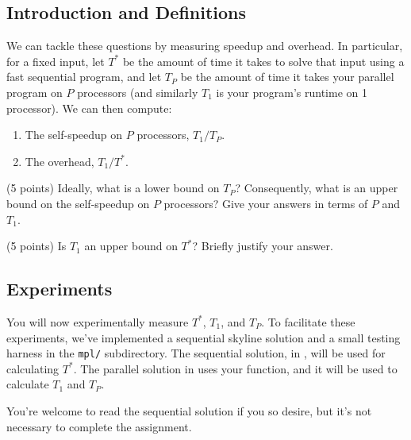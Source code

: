 \subsection{Introduction and Definitions}
\label{subsub:defns}

We can tackle these questions by measuring speedup and overhead. In particular,
for a fixed input, let $T^*$ be the amount of time it takes to solve that
input using a fast sequential program, and let $T_P$ be the amount of time it
takes your parallel program on $P$ processors (and similarly $T_1$ is your program's
runtime on 1 processor). We can then compute:
%
\begin{enumerate}
\item The self-speedup on $P$ processors, $T_1 / T_P$.
\item The overhead, $T_1 / T^*$.
\end{enumerate}

\begin{task}[2]
(5 points)
Ideally, what is a lower bound on $T_P$? Consequently, what is an upper bound on
the self-speedup on $P$ processors? Give your answers in terms of $P$ and $T_1$.
\end{task}

\begin{task}[3]
(5 points)
Is $T_1$ an upper bound on $T^*$? Briefly justify your answer.
\end{task}

\subsection{Experiments}

\begin{flex}

You will now experimentally measure $T^*$, $T_1$, and $T_P$. To facilitate these
experiments, we've implemented a sequential skyline solution and a small testing
harness in the \texttt{mpl/} subdirectory. The sequential solution, in
, will be used for calculating $T^*$.
The parallel solution in  uses your 
function, and it will be used to calculate $T_1$ and $T_P$.


\begin{note}
You're welcome to read the sequential solution if you so desire, but it's not
necessary to complete the assignment.
\end{note}
\end{flex}

